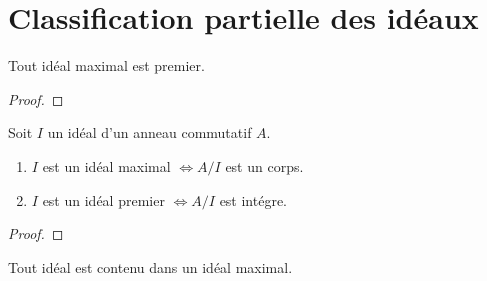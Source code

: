 

\section{Classification partielle des idéaux}


\begin{definition} 

\end{definition}

\begin{definition} 

\end{definition}

\begin{definition} 
	
\end{definition}

\begin{definition} [Corps]

\end{definition}

\begin{proposition}
	Tout idéal maximal est premier.
\end{proposition}

\begin{proof}
	
\end{proof}

\begin{proposition}
	Soit $I$ un idéal d'un anneau commutatif $A$.
	\begin{enumerate}
		\item $I$ est un idéal maximal $\Leftrightarrow A/I$ est un
			corps.
		\item $I$ est un idéal premier $\Leftrightarrow A/I$ est
			intégre.
	\end{enumerate}
\end{proposition}

\begin{proof}
	
\end{proof}

\begin{exemple}
\end{exemple}

\begin{theorem}
	Tout idéal est contenu dans un idéal maximal.
\end{theorem}

